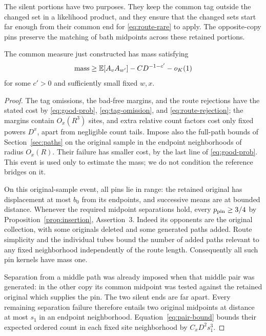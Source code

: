 

The silent portions have two purposes.  They keep the common tag
outside the changed set in a likelihood product, and they ensure that
the changed sets start far enough from their common end for
\eqref{eq:route-rare} to apply.  The opposite-copy pins preserve the
matching of bath midpoints across these retained portions.

\begin{lemma}\label{lem:long-mass}
The common measure just constructed has mass satisfying
\begin{equation}\label{eq:long-mass}
 \operatorname{mass}\ge \mathbb E[A_vA_{w'}]-CD^{-1-c'}-o_K(1)
\end{equation}
for some $c'>0$ and sufficiently small fixed $w,x$.
\end{lemma}
\begin{proof}
The tag omissions, the bad-free margins, and the route rejections
have the stated cost by \eqref{eq:good-prob},
\eqref{eq:tag-omission}, and \eqref{eq:route-rejection}; the margins
contain $O_x(R^3)$ sites, and extra relative count factors cost only
fixed powers $D^x$, apart from negligible count tails.  Impose also
the full-path bounds of Section~\ref{sec:paths} on the original
sample in the endpoint neighborhoods of radius $O_x(R)$.  Their
failure has smaller cost, by the last line of
\eqref{eq:good-prob}.  This event is used only to estimate the mass;
we do not condition the reference bridges on it.

On this original-sample event, all pins lie in range: the retained
original has displacement at most $b_0$ from its endpoints, and
successive means are at bounded distance.  Whenever the required
midpoint separations hold, every $p_{\rm pin}\ge3/4$ by
Proposition~\ref{prop:insertion}, Assertion~3.  Indeed its opponents
are the original collection, with some originals deleted and some
generated paths added.  Route simplicity and the individual tubes
bound the number of added paths relevant to any fixed neighborhood
independently of the route length.  Consequently all such pin
kernels have mass one.

Separation from a middle path was already imposed when that middle
pair was generated: in the other copy its common midpoint was
tested against the retained original which supplies the pin.  The
two silent ends are far apart.  Every remaining separation failure
therefore entails two original midpoints at distance at most $s_1$
in an endpoint neighborhood.  Equation~\eqref{eq:pair-bound} bounds
their expected ordered count in each fixed site neighborhood by
$C_xD^2s_1^3$.


\end{proof}
